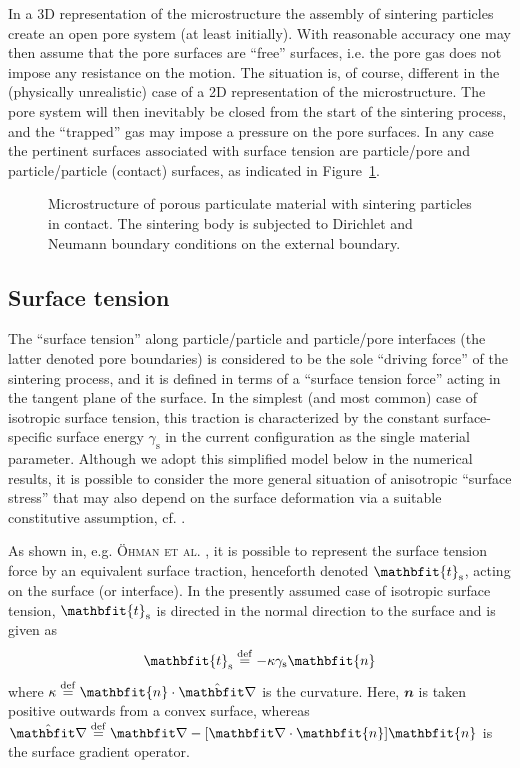 \documentclass[12pt,a4paper,fleqn]{article}
\renewcommand{\ta}[1]{\mathbfit{#1}}
\newcommand{\figref}[1]{Figure~\ref{#1}}
\newcommand{\surf}{\mathrm{s}}
\begin{document}
In a 3D representation of the microstructure the assembly of sintering particles create an open pore system (at least initially).
With reasonable accuracy one may then assume that the pore surfaces are ``free'' surfaces, i.e. the pore gas does not impose any resistance on the motion.
The situation is, of course, different in the (physically unrealistic) case of a 2D representation of the microstructure.
The pore system will then inevitably be closed from the start of the sintering process, and the ``trapped'' gas may impose a pressure on the pore surfaces.
In any case the pertinent surfaces associated with surface tension are particle/pore and particle/particle (contact) surfaces, as indicated in \figref{fig:micro}.
\begin{figure}[th!]
    \centering
    
    \caption{Microstructure of porous particulate material with sintering particles in contact. The sintering body is subjected to Dirichlet and Neumann boundary conditions on the external boundary.}
    \label{fig:micro}
\end{figure}


\subsection{Surface tension}

The ``surface tension'' along particle/particle and particle/pore interfaces (the latter denoted pore boundaries) is considered to be the sole ``driving force'' of the sintering process, and it is defined in terms of a ``surface tension force'' acting in the tangent plane of the surface.
In the simplest (and most common) case of isotropic surface tension, this traction is characterized by the constant surface-specific surface energy $\gamma_\surf$ in the current configuration as the single material parameter. Although we adopt this simplified model below in the numerical results, it is possible to consider the more general situation of anisotropic ``surface stress'' that may also depend on the surface deformation via a suitable constitutive assumption, cf. \cite{Steinmann2008:boundaryenergies}.

As shown in, e.g. \textsc{Öhman et al.} \cite{Ohman2011a}, it is possible to represent the surface tension force by an equivalent surface traction, henceforth denoted $\ta{t}_\fluct$, acting on the surface (or interface). In the presently assumed case of isotropic surface tension, $\ta{t}_\fluct$ is directed in the normal direction to the surface and is given as
\begin{equation}
    \ta{t}_\surf\defeq -\kappa\gamma_\surf\ta{n}
\label{eq:surface_traction_strong}
\end{equation}
where $\kappa\defeq\ta{n}\cdot\hat{\diff}$ is the curvature. Here, $\ta{n}$ is taken positive outwards from a convex surface, whereas $\hat\diff \defeq \diff - [\diff\cdot\ta{n}]\ta{n}$ is the surface gradient operator.
\end{document}
